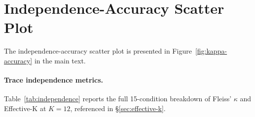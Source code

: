 \section{Independence-Accuracy Scatter Plot}
\label{app:kappa-scatter}

The independence-accuracy scatter plot is presented in Figure~\ref{fig:kappa-accuracy} in the main text.

\begin{table}[h]
\centering
\small
\caption{Independence-accuracy trade-off (FOLIO, $n = 204$). Top: aggregation methods on Mistral-7B; bottom: SC across three model families. All families produce $\kappa \geq 0.41$, confirming an architecture-independent ceiling. $\kappa$: Fleiss' kappa on raw answers.}
\label{tab:kappa_generalization}
\end{table}

\paragraph{Trace independence metrics.}
\label{app:trace-independence}

Table~\ref{tab:independence} reports the full 15-condition breakdown of Fleiss' $\kappa$ and Effective-K at $K = 12$, referenced in \S\ref{sec:effective-k}.

